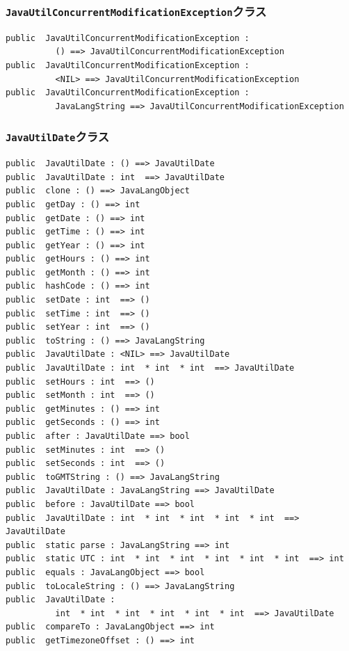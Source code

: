 \documentclass[\pformat,12pt]{jarticle}
\begin{document}
\subsubsection{\texttt{JavaUtilConcurrentModificationException}クラス}
\begin{small}
\begin{verbatim}
public  JavaUtilConcurrentModificationException : 
          () ==> JavaUtilConcurrentModificationException
public  JavaUtilConcurrentModificationException : 
          <NIL> ==> JavaUtilConcurrentModificationException
public  JavaUtilConcurrentModificationException : 
          JavaLangString ==> JavaUtilConcurrentModificationException
\end{verbatim}
\end{small}

\subsubsection{\texttt{JavaUtilDate}クラス}
\begin{small}
\begin{verbatim}
public  JavaUtilDate : () ==> JavaUtilDate
public  JavaUtilDate : int  ==> JavaUtilDate
public  clone : () ==> JavaLangObject
public  getDay : () ==> int
public  getDate : () ==> int
public  getTime : () ==> int
public  getYear : () ==> int
public  getHours : () ==> int
public  getMonth : () ==> int
public  hashCode : () ==> int
public  setDate : int  ==> ()
public  setTime : int  ==> ()
public  setYear : int  ==> ()
public  toString : () ==> JavaLangString
public  JavaUtilDate : <NIL> ==> JavaUtilDate
public  JavaUtilDate : int  * int  * int  ==> JavaUtilDate
public  setHours : int  ==> ()
public  setMonth : int  ==> ()
public  getMinutes : () ==> int
public  getSeconds : () ==> int
public  after : JavaUtilDate ==> bool
public  setMinutes : int  ==> ()
public  setSeconds : int  ==> ()
public  toGMTString : () ==> JavaLangString
public  JavaUtilDate : JavaLangString ==> JavaUtilDate
public  before : JavaUtilDate ==> bool
public  JavaUtilDate : int  * int  * int  * int  * int  ==> JavaUtilDate
public  static parse : JavaLangString ==> int
public  static UTC : int  * int  * int  * int  * int  * int  ==> int
public  equals : JavaLangObject ==> bool
public  toLocaleString : () ==> JavaLangString
public  JavaUtilDate : 
          int  * int  * int  * int  * int  * int  ==> JavaUtilDate
public  compareTo : JavaLangObject ==> int
public  getTimezoneOffset : () ==> int
\end{verbatim}
\end{small}
\end{document}

